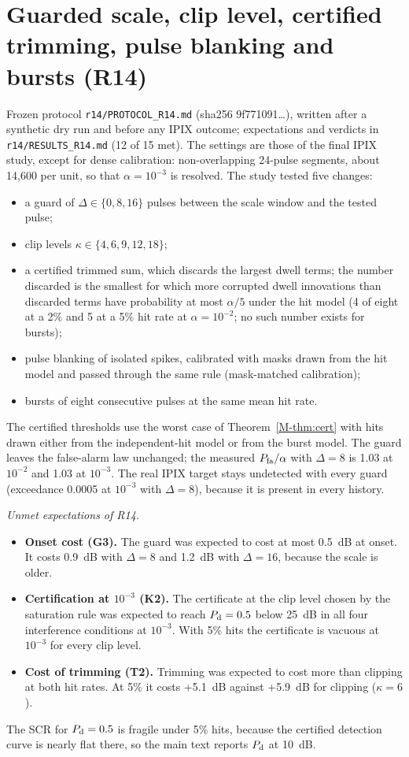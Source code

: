 \documentclass[10pt]{article}
\begin{document}
\section{Guarded scale, clip level, certified trimming, pulse blanking and bursts (R14)}\label{sup:r14}
Frozen protocol \texttt{r14/PROTOCOL\_R14.md} (sha256 9f771091\ldots), written after a synthetic dry run and before any IPIX outcome; expectations and verdicts in \texttt{r14/RESULTS\_R14.md} (12 of 15 met). The settings are those of the final IPIX study, except for dense calibration: non-overlapping 24-pulse segments, about 14,600 per unit, so that $\alpha=10^{-3}$ is resolved. The study tested five changes:
\begin{itemize}
\item a guard of $\Delta\in\{0,8,16\}$ pulses between the scale window and the tested pulse;
\item clip levels $\kappa\in\{4,6,9,12,18\}$;
\item a certified trimmed sum, which discards the largest dwell terms; the number discarded is the smallest for which more corrupted dwell innovations than discarded terms have probability at most $\alpha/5$ under the hit model (4 of eight at a 2\% and 5 at a 5\% hit rate at $\alpha=10^{-2}$; no such number exists for bursts);
\item pulse blanking of isolated spikes, calibrated with masks drawn from the hit model and passed through the same rule (mask-matched calibration);
\item bursts of eight consecutive pulses at the same mean hit rate.
\end{itemize}
The certified thresholds use the worst case of Theorem~\ref{M-thm:cert} with hits drawn either from the independent-hit model or from the burst model. The guard leaves the false-alarm law unchanged; the measured $P_{\rm fa}/\alpha$ with $\Delta=8$ is 1.03 at $10^{-2}$ and 1.03 at $10^{-3}$. The real IPIX target stays undetected with every guard (exceedance 0.0005 at $10^{-3}$ with $\Delta=8$), because it is present in every history.

\emph{Unmet expectations of R14.}
\begin{itemize}
\item \textbf{Onset cost (G3).} The guard was expected to cost at most 0.5~dB at onset. It costs 0.9~dB with $\Delta=8$ and 1.2~dB with $\Delta=16$, because the scale is older.
\item \textbf{Certification at $10^{-3}$ (K2).} The certificate at the clip level chosen by the saturation rule was expected to reach $P_{\rm d}=0.5$ below 25~dB in all four interference conditions at $10^{-3}$. With 5\% hits the certificate is vacuous at $10^{-3}$ for every clip level.
\item \textbf{Cost of trimming (T2).} Trimming was expected to cost more than clipping at both hit rates. At 5\% it costs +5.1~dB against +5.9~dB for clipping ($\kappa=6$).
\end{itemize}
The SCR for $P_{\rm d}=0.5$ is fragile under 5\% hits, because the certified detection curve is nearly flat there, so the main text reports $P_{\rm d}$ at 10~dB.
\end{document}
